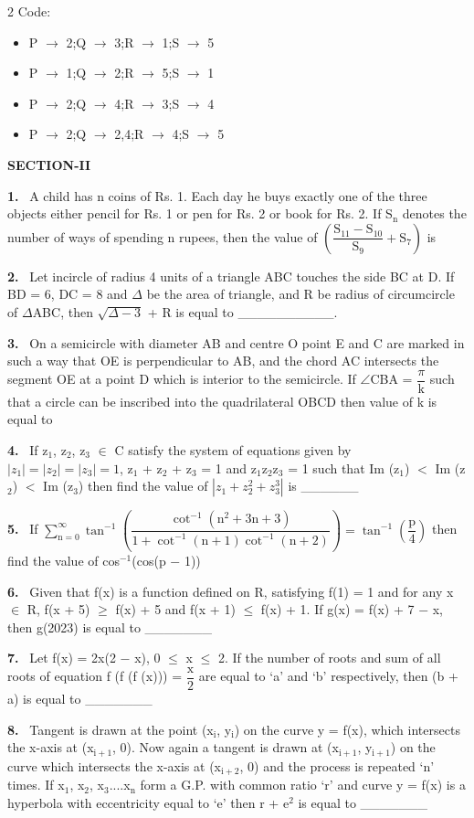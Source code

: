 \documentclass[10pt]{extarticle}
\newcommand{\sect}[1]{\par\smallskip\noindent\textbf{#1}\par}
\newcommand{\qn}[1]{\par\smallskip\noindent\textbf{#1.}~}
\newenvironment{qoptions}{\begin{itemize}[leftmargin=1.8em,itemsep=1pt,topsep=2pt,label={}]}{\end{itemize}}
\newcommand{\opt}[2]{\item[(#1)] #2}
\begin{document}
\begin{multicols}{2}
Code:
\begin{qoptions}
\opt{A}{P $\rightarrow$ 2;Q $\rightarrow$ 3;R $\rightarrow$ 1;S $\rightarrow$ 5}
\opt{B}{P $\rightarrow$ 1;Q $\rightarrow$ 2;R $\rightarrow$ 5;S $\rightarrow$ 1}
\opt{C}{P $\rightarrow$ 2;Q $\rightarrow$ 4;R $\rightarrow$ 3;S $\rightarrow$ 4}
\opt{D}{P $\rightarrow$ 2;Q $\rightarrow$ 2,4;R $\rightarrow$ 4;S $\rightarrow$ 5}
\end{qoptions}
\sect{SECTION-II}
\qn{1} A child has n coins of Rs. 1. Each day he buys exactly one of the three objects either pencil for Rs. 1 or pen for Rs. 2 or book for Rs. 2. If S$_\text{n}$ denotes the number of ways of spending n rupees, then the value of $\left(\dfrac{\text{S}_{11}-\text{S}_{10}}{\text{S}_9}+\text{S}_7\right)$ is\par
\qn{2} Let incircle of radius 4 units of a triangle ABC touches the side BC at D. If BD = 6, DC = 8 and $\Delta$ be the area of triangle, and R be radius of circumcircle of $\Delta$ABC, then $\sqrt{\Delta-3}$ + R is equal to \_\_\_\_\_\_\_\_\_\_.\par
\qn{3} On a semicircle with diameter AB and centre O point E and C are marked in such a way that OE is perpendicular to AB, and the chord AC intersects the segment OE at a point D which is interior to the semicircle. If $\angle$CBA = $\dfrac{\pi}{\text{k}}$ such that a circle can be inscribed into the quadrilateral OBCD then value of k is equal to\par
\qn{4} If z$_1$, z$_2$, z$_3$ $\in$ C satisfy the system of equations given by $|z_1|=|z_2|=|z_3|=1$, z$_1$ + z$_2$ + z$_3$ = 1 and z$_1$z$_2$z$_3$ = 1 such that Im (z$_1$) $<$ Im (z$_2$) $<$ Im (z$_3$) then find the value of $\left|z_1+z_2^2+z_3^3\right|$ is \_\_\_\_\_\_\par
\qn{5} If $\displaystyle\sum_{\text{n}=0}^{\infty}\tan^{-1}\left(\dfrac{\cot^{-1}\left(\text{n}^2+3\text{n}+3\right)}{1+\cot^{-1}(\text{n}+1)\cot^{-1}(\text{n}+2)}\right)=\tan^{-1}\left(\dfrac{\text{p}}{4}\right)$ then find the value of cos$^{-1}$(cos(p $-$ 1))\par
[Use : $\pi$ = 3.14]\par
\qn{6} Given that f(x) is a function defined on R, satisfying f(1) = 1 and for any x $\in$ R, f(x + 5) $\geq$ f(x) + 5 and f(x + 1) $\leq$ f(x) + 1. If g(x) = f(x) + 7 $-$ x, then g(2023) is equal to \_\_\_\_\_\_\_\par
\qn{7} Let f(x) = 2x(2 $-$ x), 0 $\leq$ x $\leq$ 2. If the number of roots and sum of all roots of equation f (f (f (x))) = $\dfrac{\text{x}}{2}$ are equal to `a' and `b' respectively, then (b + a) is equal to \_\_\_\_\_\_\_\par
\qn{8} Tangent is drawn at the point (x$_\text{i}$, y$_\text{i}$) on the curve y = f(x), which intersects the x-axis at (x$_{\text{i}+1}$, 0). Now again a tangent is drawn at (x$_{\text{i}+1}$, y$_{\text{i}+1}$) on the curve which intersects the x-axis at (x$_{\text{i}+2}$, 0) and the process is repeated `n' times. If x$_1$, x$_2$, x$_3$....x$_\text{n}$ form a G.P. with common ratio `r' and curve y = f(x) is a hyperbola with eccentricity equal to `e' then r + e$^2$ is equal to \_\_\_\_\_\_\_\par
\end{multicols}
\end{document}

